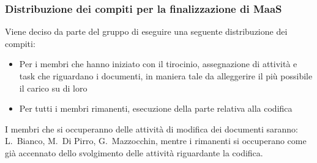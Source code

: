 \documentclass[11pt]{meetingmins}
\begin{document}
\subsubsection{Distribuzione dei compiti per la finalizzazione di MaaS}

Viene deciso da parte del gruppo di eseguire una seguente distribuzione dei compiti:
\begin{itemize}

\item Per i membri che hanno iniziato con il tirocinio, assegnazione di attività e task che riguardano i documenti, in maniera tale da alleggerire il più possibile il carico su di loro
\item Per tutti i membri rimanenti, esecuzione della parte relativa alla codifica
\end{itemize}

I membri che si occuperanno delle attività di modifica dei documenti saranno: L.~Bianco, M.~Di Pirro, G.~Mazzocchin, mentre i rimanenti si occuperano come già accennato dello svolgimento delle attività riguardante la codifica.


\end{document}
